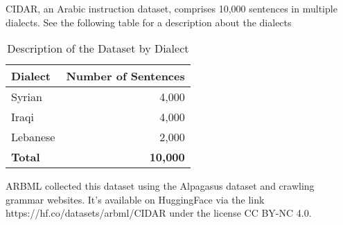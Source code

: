 CIDAR, an Arabic instruction dataset, comprises 10,000 sentences in multiple dialects. See the following table for 
a description about the dialects
\begin{table}[ht]
    \centering
    \begin{tabular}{lr}
    \toprule
    \textbf{Dialect}   & \textbf{Number of Sentences} \\
    \midrule
    Syrian     & 4,000  \\
    Iraqi      & 4,000  \\
    Lebanese   & 2,000  \\
    \midrule
    \textbf{Total} & \textbf{10,000} \\
    \bottomrule
    \end{tabular}
    \caption{Description of the Dataset by Dialect}
    \label{tab:dataset_description}
    \end{table}

ARBML collected this dataset using the Alpagasus dataset and crawling grammar websites. 
It’s available on HuggingFace via the link https://hf.co/datasets/arbml/CIDAR under the license CC BY-NC 4.0.